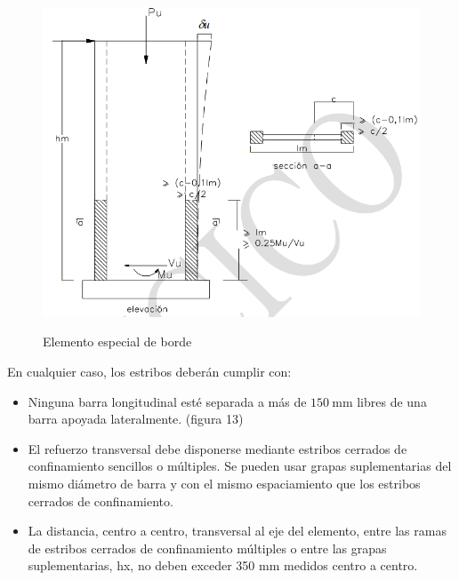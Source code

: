 \begin{figure}[h!]
    \centering
    \caption{Elemento especial de borde}
    \includegraphics[scale=0.67]{IMAGENES/pl1.PNG}
    \label{atrans}
\end{figure}

En cualquier caso, los estribos deberán cumplir con:
\begin{itemize}
  \item Ninguna barra longitudinal esté separada a más de $150 \mathrm{~mm}$ libres de una barra apoyada lateralmente. (figura 13)

  \item El refuerzo transversal debe disponerse mediante estribos cerrados de confinamiento sencillos o múltiples. Se pueden usar grapas suplementarias del mismo diámetro de barra y con el mismo espaciamiento que los estribos cerrados de confinamiento.

  \item La distancia, centro a centro, transversal al eje del elemento, entre las ramas de estribos cerrados de confinamiento múltiples o entre las grapas suplementarias, hx, no deben exceder 350 mm medidos centro a centro.

\end{itemize}

